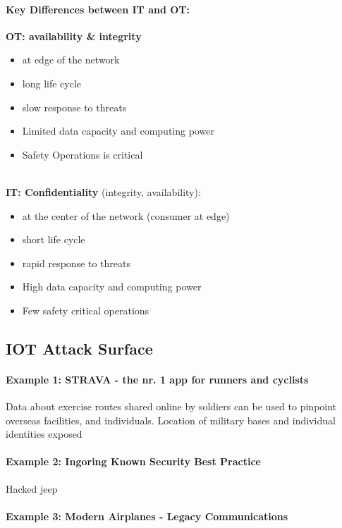 \paragraph{Key Differences between IT and OT:}
\textbf{OT: availability \& integrity}
\begin{itemize}
    \item at edge of the network
    \item long life cycle
    \item slow response to threats
    \item Limited data capacity and computing power
    \item Safety Operations is critical
\end{itemize}
\\
\textbf{IT: Confidentiality} (integrity, availability):
\begin{itemize}
    \item at the center of the network (consumer at edge)
    \item short life cycle
    \item rapid response to threats
    \item High data capacity and computing power
    \item Few safety critical operations
\end{itemize}

\subsection{IOT	Attack Surface}

\paragraph{Example 1: STRAVA - the nr. 1 app for runners and cyclists}
Data about exercise routes shared online by soldiers can be used to pinpoint overseas facilities, and individuals. Location of military bases and individual identities exposed

\paragraph{Example 2: Ingoring Known Security Best Practice}
Hacked jeep

\paragraph{Example 3: Modern Airplanes - Legacy Communications}

